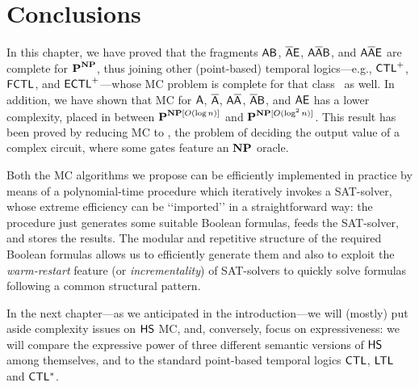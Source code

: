 \section{Conclusions}
In this chapter, we have proved that the fragments $\mathsf{AB}$, $\mathsf{\overline{A}E}$, $\mathsf{A\overline{A}B}$, and $\mathsf{A\overline{A}E}$ are complete for $\textbf{P}^{\textbf{NP}}$, thus joining other (point-based) temporal logics---e.g., $\text{\sffamily CTL}^+$, $\mathsf{F}\text{\sffamily CTL}$, and $\mathsf{E}\text{\sffamily CTL}^+$---whose MC problem is complete for that class~\cite{LMS01} as well. 
In addition, we have shown that MC for $\mathsf{A}$, $\mathsf{\overline{A}}$, $\mathsf{A\overline{A}}$, $\mathsf{\overline{A}B}$, and $\mathsf{AE}$ has a lower complexity, placed in between $\textbf{P}^{\textbf{NP}[O(\log n)]}$ and $\textbf{P}^{\textbf{NP}[O(\log^2 n)]}$. This result has been proved by reducing MC to \TBSATM, the problem of deciding the output value of a complex circuit, where some gates feature an $\textbf{NP}$ oracle.

Both the MC algorithms we propose can be efficiently implemented in practice by means of a polynomial-time procedure which iteratively invokes a SAT-solver, whose
extreme efficiency can be \lq\lq imported\rq\rq{} in a straightforward way: the procedure just generates some suitable Boolean formulas, feeds the SAT-solver, and stores the results. 
The modular and repetitive structure of the required Boolean formulas allows us to efficiently generate them and also to exploit the \emph{warm-restart} feature (or \emph{incrementality}) of SAT-solvers to quickly solve formulas following a common structural pattern.

In the next chapter---as we anticipated in the introduction---we will (mostly) put aside complexity issues on $\text{\sffamily HS}$ MC, and, conversely, focus on expressiveness: we will compare the expressive power of three different semantic versions of $\text{\sffamily HS}$ among themselves, and to the standard point-based temporal logics $\text{\sffamily CTL}$, $\text{\sffamily LTL}$ and $\text{\sffamily CTL$^{*}$}$.